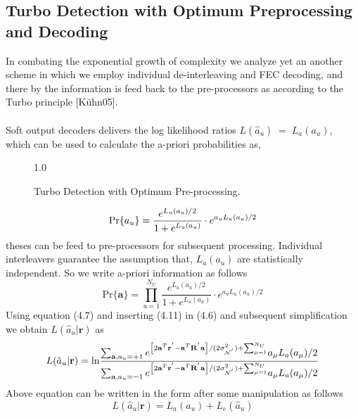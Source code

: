 \subsection{Turbo Detection with Optimum Preprocessing and Decoding}
In combating the exponential growth of complexity we analyze yet an another scheme in which we employ individual de-interleaving and FEC decoding, and there by the information is feed back to the pre-processors as according to the Turbo principle [K\"uhn05]. \\ \\
Soft output decoders delivers the log likelihood ratios $L(\hat{a}_u)\;=\;L_a(a_u)$, which can be used to calculate the a-priori probabilities as,
\begin{figure}[htb]
\centerline{  {1.0} }
\caption{Turbo Detection with Optimum Pre-processing.}
\end{figure}
\begin{equation}
\mathrm{Pr}\{a_u\}=\frac{\hbox{$e^{L_u(a_u)/2}$}}{\hbox{$1+e^{L_u(a_u)}$}}\cdot e^{a_uL_u(a_u)/2}
\end{equation}
theses can be feed to pre-processors for subsequent processing. Individual interleavers guarantee the assumption that, $L_a(a_u)$ are statistically independent. So we write a-priori information as follows
\begin{equation}
\mathrm{Pr}\{\mathrm{\mathbf{a}}\}=\prod\limits_{u=1}^{N_U}\frac{e^{L_a(a_u)/2}}{1+e^{L_u(a_u)}}\cdot e^{a_uL_u(a_u)/2}
\end{equation}
Using equation (4.7) and inserting (4.11) in (4.6) and subsequent simplification we obtain $L(\hat{a}_u\vert \mathrm{\mathbf{r}})$ as
\begin{equation}
L(\hat{a}_u\vert \mathrm{\mathbf{r}})=
\mathrm{ln}
\frac
{
\hbox{$\sum_{\mathrm{\mathbf{a}},a_u=+1}e^{\left[2\mathrm{\mathbf{a}}^T\mathrm{\mathbf{r}}^{'}-\mathrm{\mathbf{a}}^{T}\mathrm{\mathbf{R}}^{'}\mathrm{\mathbf{a}}\right]/(2\sigma^2_{\mathcal{N}^{'}})+\sum_{\mu = 1}^{N_U}}a_{\mu}L_a(a_{\mu})/2$}
}
{
\hbox{$\sum_{\mathrm{\mathbf{a}},a_u=-1}e^{\left[2\mathrm{\mathbf{a}}^T\mathrm{\mathbf{r}}^{'}-\mathrm{\mathbf{a}}^{T}\mathrm{\mathbf{R}}^{'}\mathrm{\mathbf{a}}\right]/(2\sigma^2_{\mathcal{N}^{'}})+\sum_{\mu = 1}^{N_U}}a_{\mu}L_a(a_{\mu})/2$}
}
\end{equation}
Above equation can be written in the form after some manipulation as follows
\begin{equation}
L(\hat{a}_u\vert \mathrm{\mathbf{r}})=L_a(a_u)+L_e(\hat{a}_u)
\end{equation}
